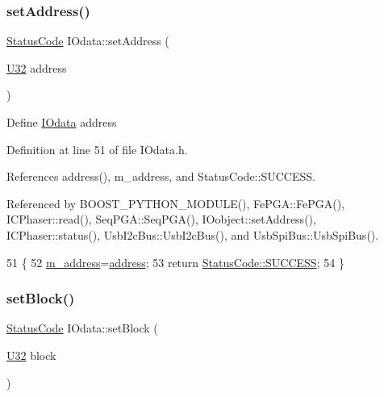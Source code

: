 \subsubsection{\texorpdfstring{set\+Address()}{setAddress()}}
{\footnotesize\ttfamily \hyperlink{classStatusCode}{Status\+Code} I\+Odata\+::set\+Address (\begin{DoxyParamCaption}\item[{\hyperlink{classIOdata_a96fb57f5fcd87b708743abd3c86a5198}{U32}}]{address }\end{DoxyParamCaption})\hspace{0.3cm}{\ttfamily [inline]}}

Define \hyperlink{classIOdata}{I\+Odata} address 

Definition at line 51 of file I\+Odata.\+h.



References address(), m\+\_\+address, and Status\+Code\+::\+S\+U\+C\+C\+E\+SS.



Referenced by B\+O\+O\+S\+T\+\_\+\+P\+Y\+T\+H\+O\+N\+\_\+\+M\+O\+D\+U\+L\+E(), Fe\+P\+G\+A\+::\+Fe\+P\+G\+A(), I\+C\+Phaser\+::read(), Seq\+P\+G\+A\+::\+Seq\+P\+G\+A(), I\+Oobject\+::set\+Address(), I\+C\+Phaser\+::status(), Usb\+I2c\+Bus\+::\+Usb\+I2c\+Bus(), and Usb\+Spi\+Bus\+::\+Usb\+Spi\+Bus().


\begin{DoxyCode}
51                                     \{
52     \hyperlink{classIOdata_a965810e1888b904c575277f50cea734a}{m\_address}=\hyperlink{classIOdata_afe410c86881b8c2082a08e5ce9843306}{address};
53     \textcolor{keywordflow}{return} \hyperlink{classStatusCode_a6f565cbeadc76d14c72f047e5e85eb4badd0da38d3ba0d922efd1f4619bc37ad8}{StatusCode::SUCCESS};
54   \}
\end{DoxyCode}
\mbox{\label{classIOdata_a334f07d85e3dc8069551dcd8ab942e9c}} 
\subsubsection{\texorpdfstring{set\+Block()}{setBlock()}}
{\footnotesize\ttfamily \hyperlink{classStatusCode}{Status\+Code} I\+Odata\+::set\+Block (\begin{DoxyParamCaption}\item[{\hyperlink{classIOdata_a96fb57f5fcd87b708743abd3c86a5198}{U32}}]{block }\end{DoxyParamCaption})\hspace{0.3cm}{\ttfamily [inline]}}

